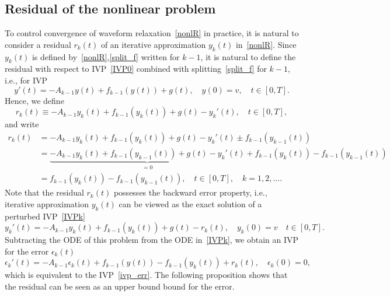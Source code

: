 \documentclass[sn-aps]{sn-jnl}
\theoremstyle{thmstyleone}%
\theoremstyle{thmstyletwo}%
\theoremstyle{thmstylethree}%
\begin{document}
\subsection{Residual of the nonlinear problem}
\label{s:nonl_r}
To control convergence of waveform relaxation~\eqref{nonlR}
in practice, it is natural to consider a residual $r_k(t)$ of an iterative
approximation $y_k(t)$ in~\eqref{nonlR}.
Since $y_k(t)$ is defined by~\eqref{nonlR},\eqref{split_f} written for $k-1$,
it is natural to define the residual with respect to IVP~\eqref{IVP0}
combined with splitting~\eqref{split_f} for $k-1$, i.e., for IVP
\begin{equation}
\label{IVPk}  
y'(t) = -A_{k-1}y(t) + f_{k-1}(y(t)) + g(t),\quad
y(0) = v, \quad t\in[0,T].
\end{equation}
Hence, we define
\begin{equation}
\label{rk_def}
r_k(t) \equiv -A_{k-1}y_k(t) + f_{k-1}(y_k(t)) + g(t) - y_k'(t), \quad t\in [0,T],
\end{equation}
and write
\begin{equation}
\label{rk}
\begin{aligned}
r_k(t) &= -A_{k-1}y_k(t) + f_{k-1}(y_k(t)) + g(t) - y_k'(t) \pm f_{k-1}(y_{k-1}(t)) \\
       &= \underbrace{-A_{k-1}y_k(t) + f_{k-1}(y_{k-1}(t)) + g(t) - y_k'(t)}_{= 0} + 
          f_{k-1}(y_k(t)) - f_{k-1}(y_{k-1}(t)) \\
       &= f_{k-1}(y_k(t)) - f_{k-1}(y_{k-1}(t)), \quad t\in[0,T], \quad k=1,2,\dots .
\end{aligned}
\end{equation}
Note that the residual $r_k(t)$ possesses the backward error property,
i.e., iterative approximation $y_k(t)$ can be viewed as the exact solution of
a perturbed IVP~\eqref{IVPk}
\begin{equation}
\label{IVP_rk}
y_k'(t) = -A_{k-1}y_k(t) + f_{k-1}(y_k(t)) + g(t) - r_k(t),
\quad y_k(0) = v \quad t\in [0,T].  
\end{equation}
Subtracting the ODE of this problem from the ODE in~\eqref{IVPk}, we obtain
an IVP for the error $\epsilon_k(t)$
\begin{equation}
\label{ivp_err1}
\epsilon_k'(t) = -A_{k-1}\epsilon_k(t) + f_{k-1}(y(t))-f_{k-1}(y_k(t)) + r_k(t),
\quad
\epsilon_k(0) = 0,
\end{equation}
which is equivalent to the IVP~\eqref{ivp_err}.
The following proposition shows that the residual can be seen 
as an upper bound bound for the error.
\end{document}
